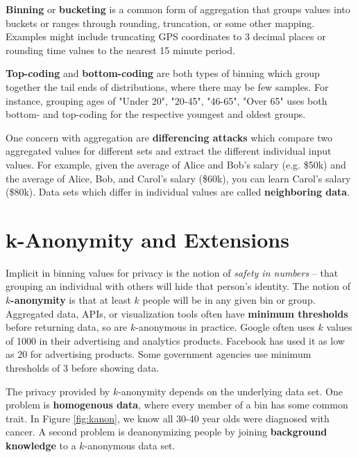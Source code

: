 \documentclass[nobib]{tufte-handout}
\begin{document}
\textbf{Binning} or \textbf{bucketing} is a common form of aggregation that
groups values into buckets or ranges through rounding, truncation, or some
other mapping. Examples might include truncating GPS coordinates to 3 decimal
places or rounding time values to the nearest 15 minute period.

\textbf{Top-coding} and \textbf{bottom-coding} are both types of binning which
group together the tail ends of distributions, where there may be few samples.
For instance, grouping ages of "Under 20", "20-45", "46-65", "Over 65" uses both
bottom- and top-coding for the respective youngest and oldest groups.

One concern with aggregation are \textbf{differencing attacks} which compare two
aggregated values for different sets and extract the different individual input
values. For example, given the average of Alice and Bob’s salary (e.g. \$50k)
and the average of Alice, Bob, and Carol’s salary (\$60k), you can learn
Carol’s salary (\$80k). Data sets which differ in individual values are
called \textbf{neighboring data}.

\section{k-Anonymity and Extensions}

Implicit in binning values for privacy is the notion of
\textit{safety in numbers} -- that grouping an individual with others will hide
that person's identity. The notion of \textbf{$k$-anonymity}
\cite{DBLP:journals/ijufks/Sweene02} is that at least $k$ people will be in any
given bin or group. Aggregated data, APIs, or visualization tools often have
\textbf{minimum thresholds} before returning data, so are $k$-anonymous in
practice. Google often uses $k$ values of 1000 in their advertising and
analytics products. Facebook has used it as low as 20 for advertising products.
Some government agencies use minimum thresholds of 3 before showing data.

The privacy provided by $k$-anonymity depends on the underlying data set. One
problem is \textbf{homogenous data}, where every member of a bin has some common
trait. In Figure \ref{fig:kanon}, we know all 30-40 year olds were diagnosed with
cancer. A second problem is deanonymizing people by joining
\textbf{background knowledge} to a $k$-anonymous data set.
\end{document}

